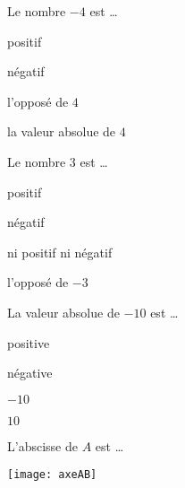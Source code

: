 


\begin{QCM}
  \begin{GroupeQCM}
    \begin{exercice}
      Le nombre $-4$ est \ldots
      \begin{ChoixQCM}{4}
      \item positif
      \item négatif
      \item l'opposé de $4$
      \item la valeur absolue de $4$
      \end{ChoixQCM}
\begin{corrige}
   \end{corrige}
    \end{exercice}
    
    
    \begin{exercice}
      Le nombre 3 est \ldots
      \begin{ChoixQCM}{4}
      \item positif
      \item négatif
      \item ni positif ni négatif
      \item l'opposé de $-3$
      \end{ChoixQCM}
\begin{corrige}
   \end{corrige}
    \end{exercice}


    \begin{exercice}
      La valeur absolue de $-10$ est \ldots
      \begin{ChoixQCM}{4}
      \item positive
      \item négative
      \item $-10$
      \item $10$
      \end{ChoixQCM}
\begin{corrige}
   \end{corrige}
    \end{exercice}


    \begin{exercice}
      L'abscisse de $A$ est \ldots 
\vspace{-2em}
\begin{center}  \texttt{[image: axeAB]} \end{center}


\end{exercice}
\end{GroupeQCM}
\end{QCM}
